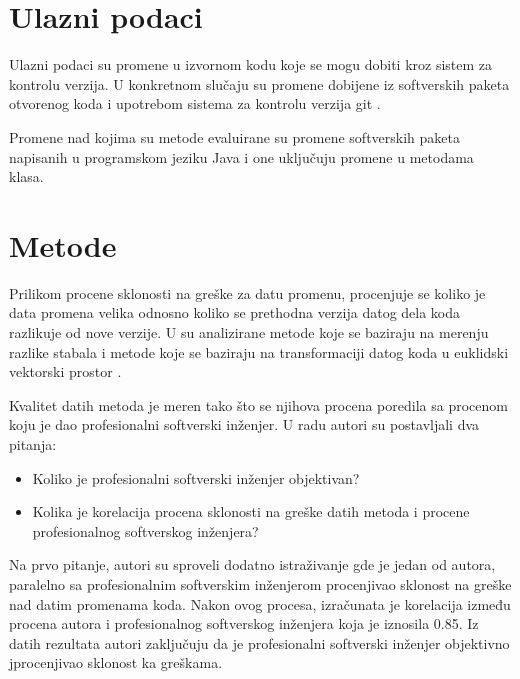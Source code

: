 \documentclass[twocolumns]{article}
\begin{document}
\begin{multicols}{2}
  
  
  \section{Ulazni podaci}
  \label{sec:input_data}
  
  Ulazni podaci su promene u izvornom kodu koje se mogu dobiti kroz sistem za kontrolu verzija. U konkretnom slučaju su promene dobijene iz softverskih paketa otvorenog koda i upotrebom sistema za kontrolu verzija git \cite{spinellis2012git}. 
  
  Promene nad kojima su metode evaluirane su promene softverskih paketa napisanih u programskom jeziku Java i one uključuju promene u metodama klasa. 
  
  \section{Metode}
  \label{sec:methods}
  
  Prilikom procene sklonosti na greške za datu promenu, procenjuje se koliko je data promena velika odnosno koliko se prethodna verzija datog dela koda razlikuje od nove verzije. U \cite{altiero2023ai} su analizirane metode koje se baziraju na merenju razlike stabala \cite{moschitti2006making} i metode koje se baziraju na transformaciji datog koda u euklidski vektorski prostor \cite{feng2020codebert}. 
  
  Kvalitet datih metoda je meren tako što se njihova procena poredila sa procenom koju je dao profesionalni softverski inženjer. U radu autori su postavljali dva pitanja:
  
  \begin{itemize}
    \item Koliko je profesionalni softverski inženjer objektivan?
    \item Kolika je korelacija procena sklonosti na greške datih metoda i procene profesionalnog softverskog inženjera?
  \end{itemize}
  
  
  Na prvo pitanje, autori su sproveli dodatno istraživanje gde je jedan od autora, paralelno sa profesionalnim softverskim inženjerom procenjivao sklonost na greške nad datim promenama koda. Nakon ovog procesa, izračunata je korelacija između procena autora i profesionalnog softverskog inženjera koja je iznosila 0.85. Iz datih rezultata autori zaključuju da je profesionalni softverski inženjer objektivno jprocenjivao sklonost ka greškama. 
  

\end{multicols}
\end{document}
